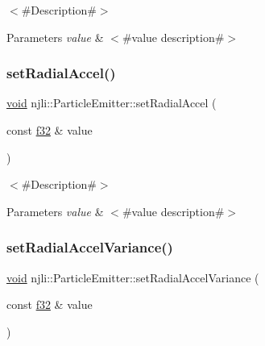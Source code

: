 $<$\#\+Description\#$>$


\begin{DoxyParams}{Parameters}
{\em value} & $<$\#value description\#$>$ \\
\hline
\end{DoxyParams}
\mbox{\label{classnjli_1_1_particle_emitter_a4199bf8b709d0f6bce526afabb2a0803}} 
\subsubsection{\texorpdfstring{set\+Radial\+Accel()}{setRadialAccel()}}
{\footnotesize\ttfamily \mbox{\hyperlink{_thread_8h_af1e856da2e658414cb2456cb6f7ebc66}{void}} njli\+::\+Particle\+Emitter\+::set\+Radial\+Accel (\begin{DoxyParamCaption}\item[{const \mbox{\hyperlink{_util_8h_a5f6906312a689f27d70e9d086649d3fd}{f32}} \&}]{value }\end{DoxyParamCaption})}

$<$\#\+Description\#$>$


\begin{DoxyParams}{Parameters}
{\em value} & $<$\#value description\#$>$ \\
\hline
\end{DoxyParams}
\mbox{\label{classnjli_1_1_particle_emitter_a36a8d257bb331e40001575edda7a1564}} 
\subsubsection{\texorpdfstring{set\+Radial\+Accel\+Variance()}{setRadialAccelVariance()}}
{\footnotesize\ttfamily \mbox{\hyperlink{_thread_8h_af1e856da2e658414cb2456cb6f7ebc66}{void}} njli\+::\+Particle\+Emitter\+::set\+Radial\+Accel\+Variance (\begin{DoxyParamCaption}\item[{const \mbox{\hyperlink{_util_8h_a5f6906312a689f27d70e9d086649d3fd}{f32}} \&}]{value }\end{DoxyParamCaption})}

